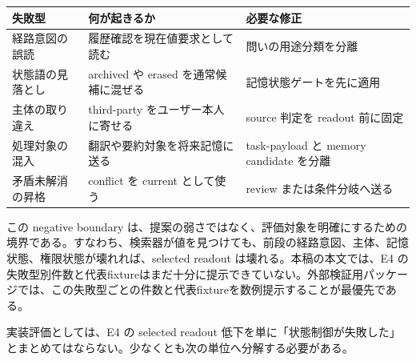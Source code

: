 \documentclass[12pt,a4paper]{article}
\begin{document}
{\def\LTcaptype{table} %
\begin{longtable}[]{@{}
  >{\raggedright\arraybackslash}p{}
  >{\raggedright\arraybackslash}p{}
  >{\raggedright\arraybackslash}p{}@{}}
\toprule\noalign{}
\begin{minipage}[b]{\linewidth}\raggedright
失敗型
\end{minipage} & \begin{minipage}[b]{\linewidth}\raggedright
何が起きるか
\end{minipage} & \begin{minipage}[b]{\linewidth}\raggedright
必要な修正
\end{minipage} \\
\midrule\noalign{}
\endhead
\bottomrule\noalign{}
\endlastfoot
経路意図の誤読 & 履歴確認を現在値要求として読む & 問いの用途分類を分離 \\
状態語の見落とし & archived や erased を通常候補に混ぜる & 記憶状態ゲートを先に適用 \\
主体の取り違え & third-party をユーザー本人に寄せる & source 判定を readout 前に固定 \\
処理対象の混入 & 翻訳や要約対象を将来記憶に送る & task-payload と memory candidate を分離 \\
矛盾未解消の昇格 & conflict を current として使う & review または条件分岐へ送る \\
\end{longtable}
}

この negative boundary は、提案の弱さではなく、評価対象を明確にするための境界である。すなわち、検索器が値を見つけても、前段の経路意図、主体、記憶状態、権限状態が壊れれば、selected readout は壊れる。本稿の本文では、E4 の失敗型別件数と代表fixtureはまだ十分に提示できていない。外部検証用パッケージでは、この失敗型ごとの件数と代表fixtureを数例提示することが最優先である。

実装評価としては、E4 の selected readout 低下を単に「状態制御が失敗した」とまとめてはならない。少なくとも次の単位へ分解する必要がある。
\end{document}
